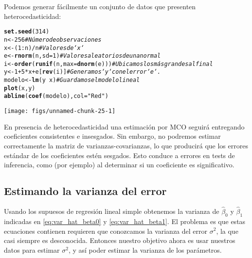 \documentclass{report}\usepackage[]{graphicx}\usepackage[]{color}
\makeatletter
\newcommand{\hlnum}[1]{\textcolor[rgb]{0.686,0.059,0.569}{#1}}%
\newcommand{\hlstr}[1]{\textcolor[rgb]{0.192,0.494,0.8}{#1}}%
\newcommand{\hlcom}[1]{\textcolor[rgb]{0.678,0.584,0.686}{\textit{#1}}}%
\newcommand{\hlopt}[1]{\textcolor[rgb]{0,0,0}{#1}}%
\newcommand{\hlstd}[1]{\textcolor[rgb]{0.345,0.345,0.345}{#1}}%
\newcommand{\hlkwb}[1]{\textcolor[rgb]{0.69,0.353,0.396}{#1}}%
\newcommand{\hlkwc}[1]{\textcolor[rgb]{0.333,0.667,0.333}{#1}}%
\newcommand{\hlkwd}[1]{\textcolor[rgb]{0.737,0.353,0.396}{\textbf{#1}}}%
\newenvironment{kframe}{%
 \def\at@end@of@kframe{}%
 \ifinner\ifhmode%
  \def\at@end@of@kframe{\end{minipage}}%
  \begin{minipage}{\columnwidth}%
 \fi\fi%
 \def\FrameCommand##1{\hskip\@totalleftmargin \hskip-\fboxsep
 \colorbox{shadecolor}{##1}\hskip-\fboxsep
     \hskip-\linewidth \hskip-\@totalleftmargin \hskip\columnwidth}%
 \MakeFramed {\advance\hsize-\width
   \@totalleftmargin\z@ \linewidth\hsize
   \@setminipage}}%
 {\par\unskip\endMakeFramed%
 \at@end@of@kframe}
\newenvironment{knitrout}{}{} %
\makeatother
\begin{document}
Podemos generar fácilmente un conjunto de datos que presenten heterocedasticidad:

\begin{knitrout}
\color{fgcolor}\begin{kframe}
\begin{alltt}
\hlkwd{set.seed}\hlstd{(}\hlnum{314}\hlstd{)}
\hlstd{n} \hlkwb{<-} \hlnum{256}                           \hlcom{# Número de observaciones}
\hlstd{x} \hlkwb{<-} \hlstd{(}\hlnum{1}\hlopt{:}\hlstd{n)}\hlopt{/}\hlstd{n}                       \hlcom{# Valores de `x`}
\hlstd{e} \hlkwb{<-} \hlkwd{rnorm}\hlstd{(n,} \hlkwc{sd}\hlstd{=}\hlnum{1}\hlstd{)}                \hlcom{# Valores aleatorios de una normal}
\hlstd{i} \hlkwb{<-} \hlkwd{order}\hlstd{(}\hlkwd{runif}\hlstd{(n,} \hlkwc{max}\hlstd{=}\hlkwd{dnorm}\hlstd{(e)))} \hlcom{# Ubicamos los más grandes al final}
\hlstd{y} \hlkwb{<-} \hlnum{1} \hlopt{+} \hlnum{5} \hlopt{*} \hlstd{x} \hlopt{+} \hlstd{e[}\hlkwd{rev}\hlstd{(i)]}         \hlcom{# Generamos `y` con el error `e`.}
\hlstd{modelo} \hlkwb{<-} \hlkwd{lm}\hlstd{(y} \hlopt{~} \hlstd{x)}                \hlcom{# Guardamos el modelo lineal}
\hlkwd{plot}\hlstd{(x, y)}
\hlkwd{abline}\hlstd{(}\hlkwd{coef}\hlstd{(modelo),} \hlkwc{col} \hlstd{=} \hlstr{"Red"}\hlstd{)}
\end{alltt}
\end{kframe}

{\centering \texttt{[image: figs/unnamed-chunk-25-1]} 

}



\end{knitrout}

En presencia de heterocedasticidad una estimación por MCO seguirá entregando coeficientes consistentes e insesgados. Sin embargo, no podremos estimar correctamente la matriz de varianzas-covarianzas, lo que producirá que los errores estándar de los coeficientes estén sesgados. Esto conduce a errores en tests de inferencia, como (por ejemplo) al determinar si un coeficiente es significativo.

\subsection{Estimando la varianza del error}

Usando los supuesos de regresión lineal simple obtenemos la varianza de $\hat\beta_0$ y $\hat\beta_1$ indicadas en \eqref{eq:var_hat_beta0} y \eqref{eq:var_hat_beta1}.
El problema es que estas ecuaciones contienen requieren que conozcamos la varianza del error $\sigma^2$, la que casi siempre es desconocida.
Entonces nuestro objetivo ahora es usar nuestros datos para estimar $\sigma^2$, y así poder estimar la varianza de los parámetros.
\end{document}
